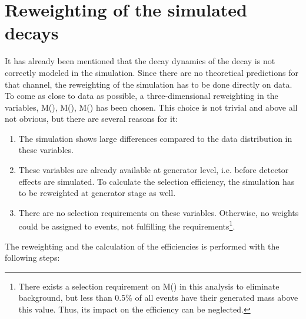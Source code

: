 \section{Reweighting of the simulated \LbToDpmunuX decays}
\label{sec:Reweight_D0p}
It has already been mentioned that the decay dynamics of the \LbToDpmunuX decay is not correctly modeled in the simulation.
Since there are no theoretical predictions for that channel, the reweighting of the simulation has to be done directly on data.
To come as close to data as possible, a three-dimensional reweighting in the variables, M(\Dz\proton), M(\Dz\mun), M(\Dz\proton\mun) has been chosen. 
This choice is not trivial and above all not obvious, but there are several reasons for it:
\begin{enumerate}
    \item The simulation shows large differences compared to the data distribution in these variables.
    \item These variables are already available at generator level, i.e. before detector effects are simulated. 
          To calculate the selection efficiency, the simulation has to be reweighted at generator stage as well.
    \item There are no selection requirements on these variables. 
          Otherwise, no weights could be assigned to events, not fulfilling the requirements\footnote{There exists a selection requirement on M(\Dz\proton\mun) in this analysis to eliminate \decay{\Lb}{\Dz\proton\pim} background, but less than 0.5\% of all events have their generated mass above this value. 
                    Thus, its impact on the efficiency can be neglected.}.
\end{enumerate}
The reweighting and the calculation of the efficiencies is performed with the following steps:
